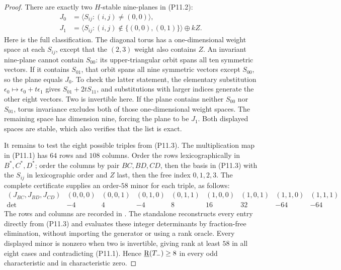\begin{proof}
There are exactly two $H$-stable nine-planes in (P11.2):
\[
 \begin{split}
 J_0&=\langle S_{ij}:(i,j)\ne(0,0)\rangle,\\
 J_1&=\langle S_{ij}:(i,j)\notin\{(0,0),(0,1)\}\rangle
          \oplus kZ.
 \end{split}
 \tag{P11.3}
\]
Here is the full classification. The diagonal torus
has a one-dimensional weight space at each $S_{ij}$,
except that the $(2,3)$ weight also contains $Z$.
An invariant nine-plane cannot contain $S_{00}$:
its upper-triangular orbit spans all ten symmetric
vectors. If it contains $S_{01}$, that orbit spans
all nine symmetric vectors except $S_{00}$, so the
plane equals $J_0$. To check the latter statement,
the elementary substitution
$\epsilon_0\mapsto\epsilon_0+t\epsilon_1$ gives
$S_{01}+2tS_{11}$, and substitutions with larger
indices generate the other eight vectors. Two is
invertible here. If the plane contains neither
$S_{00}$ nor $S_{01}$, torus invariance excludes both
of those one-dimensional weight spaces. The remaining
space has dimension nine, forcing the plane to be
$J_1$. Both displayed spaces are stable, which also
verifies that the list is exact.

It remains to test the eight possible triples from
(P11.3). The multiplication map in (P11.1) has $64$
rows and $108$ columns. Order the rows lexicographically
in $B^*,C^*,D^*$; order the columns by pair $BC,BD,CD$,
then the basis in (P11.3) with the $S_{ij}$ in
lexicographic order and $Z$ last, then the free index
$0,1,2,3$. The complete certificate supplies an
order-$58$ minor for each triple, as follows:
\[
\begin{array}{c|rrrrrrrr}
 (J_{BC},J_{BD},J_{CD})
 &(0,0,0)&(0,0,1)&(0,1,0)&(0,1,1)
 &(1,0,0)&(1,0,1)&(1,1,0)&(1,1,1)\\ \hline
 \det&-4&4&-4&8&16&32&-64&-64
\end{array}
\]
The rows and columns are recorded in
.
The standalone 
reconstructs every entry directly from (P11.3) and
evaluates these integer determinants by fraction-free
elimination, without importing the generator or using
a rank oracle. Every displayed minor is nonzero when
two is invertible, giving rank at least $58$ in all
eight cases and contradicting (P11.1). Hence
$\underline{\mathrm R}(T_-)\geq8$ in every odd characteristic and in
characteristic zero.


\end{proof}

